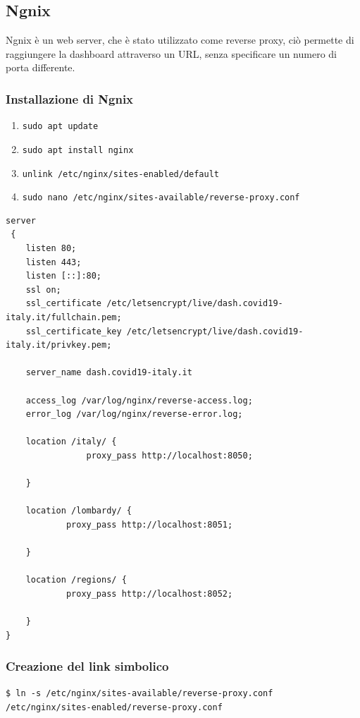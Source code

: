 \subsection{Ngnix}
Ngnix è un web server, che è stato utilizzato come reverse proxy, ciò permette di raggiungere la dashboard attraverso un URL, senza specificare un numero di porta differente.
\newpage
\subsubsection*{Installazione di Ngnix}
\begin{enumerate}
    \item \texttt{sudo apt update}
    \item \texttt{sudo apt install nginx}
    \item \texttt{unlink /etc/nginx/sites-enabled/default}
    \item \texttt{sudo nano /etc/nginx/sites-available/reverse-proxy.conf}
\end{enumerate}

\begin{lstlisting}[basicstyle=\ttfamily\small]
server
 {
    listen 80;
    listen 443;
    listen [::]:80;
    ssl on;
    ssl_certificate /etc/letsencrypt/live/dash.covid19-italy.it/fullchain.pem;
    ssl_certificate_key /etc/letsencrypt/live/dash.covid19-italy.it/privkey.pem;

    server_name dash.covid19-italy.it
    
    access_log /var/log/nginx/reverse-access.log;
    error_log /var/log/nginx/reverse-error.log;
    
    location /italy/ {
                proxy_pass http://localhost:8050;

    }

    location /lombardy/ {
            proxy_pass http://localhost:8051;

    }

    location /regions/ {
            proxy_pass http://localhost:8052;

    }
}
\end{lstlisting}

\subsubsection*{Creazione del link simbolico}
\texttt{\$ ln -s /etc/nginx/sites-available/reverse-proxy.conf\\ /etc/nginx/sites-enabled/reverse-proxy.conf}

